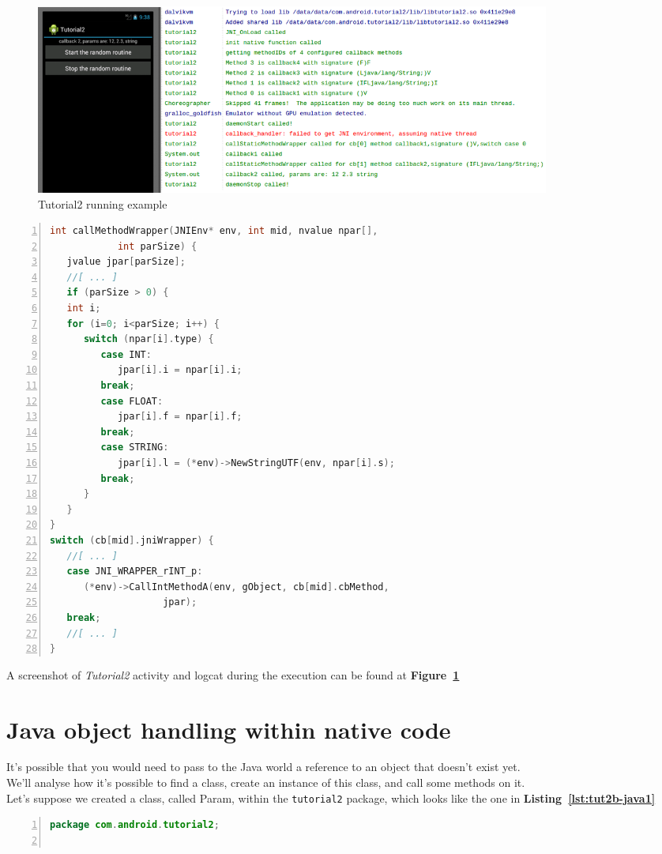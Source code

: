 \documentclass[a4paper,10pt]{article}
\newcommand{\keyword}[1]{\texttt{#1}}
\newcommand{\reff}[1]{\textbf{Figure~\ref{#1}}}
\newcommand{\refl}[1]{\textbf{Listing~\ref{#1}}}
\begin{document}
\begin{multicols}{2}
\begin{figure}[t]
 \includegraphics[width=17cm]{./figures/tut2-scr1.png}
 \caption{Tutorial2 running example}
 \label{fig:tut2-scr1}
\end{figure}
\begin{lstlisting}[language=C,
		   columns=fullflexible,
		   showstringspaces=false,
		   xleftmargin=15pt,
		   frame = l,
		   numbers=left,
		   commentstyle=\color{gray}\upshape,
		   caption=Part of tutorial2.c - callingMethodWrapper,
		   label=lst:tut2-c5]
int callMethodWrapper(JNIEnv* env, int mid, nvalue npar[],
			int parSize) {
   jvalue jpar[parSize];
   //[ ... ]
   if (parSize > 0) {
   int i;
   for (i=0; i<parSize; i++) {
      switch (npar[i].type) {
         case INT:
            jpar[i].i = npar[i].i;
         break;
         case FLOAT:
            jpar[i].f = npar[i].f;
         break;
         case STRING:
            jpar[i].l = (*env)->NewStringUTF(env, npar[i].s);
         break;
      }
   }
}
switch (cb[mid].jniWrapper) {
   //[ ... ]
   case JNI_WRAPPER_rINT_p:
      (*env)->CallIntMethodA(env, gObject, cb[mid].cbMethod,
      				jpar);
   break;
   //[ ... ]
}
\end{lstlisting}
A screenshot of \textit{Tutorial2} activity and logcat during the execution can
be found at \reff{fig:tut2-scr1}


\section{Java object handling within native code}
It's possible that you would need to pass to the Java world a reference to an
object that doesn't exist yet.\\
We'll analyse how it's possible to find a class, create an instance of this
class, and call some methods on it.\\
Let's suppose we created a class, called Param, within the \keyword{tutorial2}
package, which looks like the one in \refl{lst:tut2b-java1}
\begin{lstlisting}[language=Java,
				   columns=fullflexible,
				   showstringspaces=false,
				   xleftmargin=15pt,
				   frame = l,
				   numbers=left,
				   commentstyle=\color{gray}\upshape,
				   caption=Java class Param,
				   label=lst:tut2b-java1]
package com.android.tutorial2;


\end{lstlisting}
\end{multicols}
\end{document}
